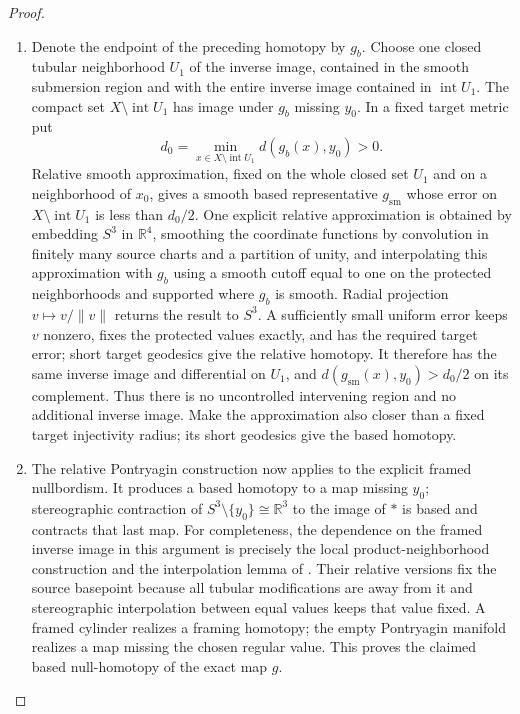 \begin{proof}
\begin{enumerate}[label=\arabic*.,leftmargin=*]
\item Denote the endpoint of the preceding homotopy by \(g_b\). Choose one
closed tubular neighborhood \(U_1\) of the inverse image, contained in
the smooth submersion region and with the entire inverse image contained
in \(\operatorname{int}U_1\). The compact set
\(X\setminus\operatorname{int}U_1\) has image under \(g_b\) missing
\(y_0\). In a fixed target metric put
\[
 d_0=\min_{x\in X\setminus\operatorname{int}U_1}
       d(g_b(x),y_0)>0.
\]
Relative smooth approximation, fixed on the whole closed set \(U_1\)
and on a neighborhood of \(x_0\), gives a smooth based representative
\(g_{\mathrm{sm}}\) whose error on
\(X\setminus\operatorname{int}U_1\) is less than \(d_0/2\).
One explicit relative approximation is obtained by embedding $S^3$ in $\mathbb R^4$, smoothing the coordinate functions by convolution in finitely many source charts and a partition of unity, and interpolating this approximation with $g_b$ using a smooth cutoff equal to one on the protected neighborhoods and supported where $g_b$ is smooth. Radial projection $v\mapsto v/\|v\|$ returns the result to $S^3$. A sufficiently small uniform error keeps $v$ nonzero, fixes the protected values exactly, and has the required target error; short target geodesics give the relative homotopy. It therefore has the same inverse image and differential on \(U_1\),
and \(d(g_{\mathrm{sm}}(x),y_0)>d_0/2\) on its complement. Thus there
is no uncontrolled intervening region and no additional inverse image.
Make the approximation also closer than a fixed target injectivity
radius; its short geodesics give the based homotopy.

\item The relative Pontryagin construction now applies to the explicit
framed nullbordism. It produces a based homotopy to a map missing
\(y_0\); stereographic contraction of \(S^3\setminus\{y_0\}\cong\mathbb R^3\)
to the image of \(*\) is based and contracts that last map.
For completeness, the dependence on the framed inverse image in this
argument is precisely the local product-neighborhood construction and
the interpolation lemma of \cite[\S7, Theorem B and Lemma 4,
pp.~43, 48--50]{CuspNullMilnor1965}. Their relative versions fix the source
basepoint because all tubular modifications are away from it and
stereographic interpolation between equal values keeps that value
fixed. A framed cylinder realizes a framing homotopy; the empty
Pontryagin manifold realizes a map missing the chosen regular value.
This proves the claimed based null-homotopy of the exact map \(g\).
\end{enumerate}
\end{proof}

